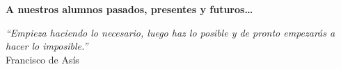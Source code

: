 
\thispagestyle{empty}

\begin{flushright}

  \vspace*{\fill}

  \textbf{A nuestros alumnos pasados, presentes y futuros\ldots}\\

  \vspace{3cm}

  \emph{``Empieza haciendo lo necesario, luego haz lo posible y de
    pronto empezarás a hacer lo imposible.''}\\ Francisco de Asís

\end{flushright}  

\vspace{4cm}
\vspace*{\fill}




